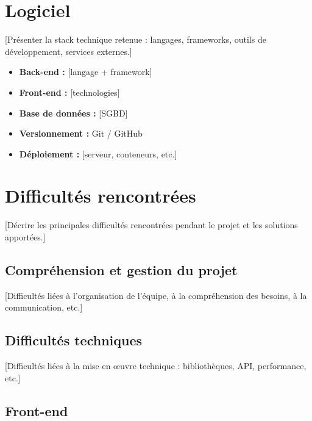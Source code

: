 \documentclass[12pt, a4paper]{article}
\begin{document}
\section{Logiciel}

[Présenter la stack technique retenue : langages, frameworks, outils de
développement, services externes.]

\begin{itemize}
  \item \textbf{Back-end :} [langage + framework]
  \item \textbf{Front-end :} [technologies]
  \item \textbf{Base de données :} [SGBD]
  \item \textbf{Versionnement :} Git / GitHub
  \item \textbf{Déploiement :} [serveur, conteneurs, etc.]
\end{itemize}

\section{Difficultés rencontrées}

[Décrire les principales difficultés rencontrées pendant le projet et les
solutions apportées.]

\subsection{Compréhension et gestion du projet}

[Difficultés liées à l'organisation de l'équipe, à la compréhension des
besoins, à la communication, etc.]

\subsection{Difficultés techniques}

[Difficultés liées à la mise en \oe{}uvre technique : bibliothèques, API,
performance, etc.]

\subsection{Front-end}
\end{document}
